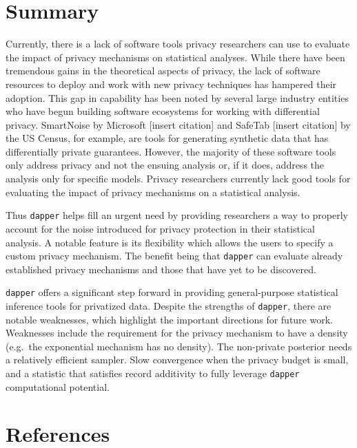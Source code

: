 \hypertarget{summary}{%
\section{Summary}\label{summary}}

Currently, there is a lack of software tools privacy researchers can use
to evaluate the impact of privacy mechanisms on statistical analyses.
While there have been tremendous gains in the theoretical aspects of privacy,
the lack of software resources to deploy and work with new privacy techniques has
hampered their adoption. This gap in capability has been noted by several
large industry entities who have begun building software ecosystems for
working with differential privacy. SmartNoise by Microsoft {[}insert citation{]} and SafeTab {[}insert citation{]} by the US Census, for example,
are tools for generating synthetic data that has differentially private guarantees.
However, the majority of these software tools only address privacy and not the
ensuing analysis or, if it does, address the analysis only for specific models.
Privacy researchers currently lack good tools for evaluating the impact
of privacy mechanisms on a statistical analysis.

Thus \texttt{dapper} helps fill an urgent need by providing researchers a way to properly account
for the noise introduced for privacy protection in their statistical analysis. A notable
feature is its flexibility which allows the users to specify a custom
privacy mechanism. The benefit being that \texttt{dapper} can evaluate already
established privacy mechanisms and those that have yet to be discovered.

\texttt{dapper} offers a significant step forward in providing general-purpose statistical
inference tools for privatized data. Despite the strengths of \texttt{dapper}, there
are notable weaknesses, which highlight the important directions for future work.
Weaknesses include the requirement for the privacy mechanism to have a density
(e.g.~the exponential mechanism has no density). The non-private posterior needs
a relatively efficient sampler. Slow convergence when the privacy budget is small,
and a statistic that satisfies record additivity to fully leverage \texttt{dapper} computational
potential.

\hypertarget{references}{%
\section*{References}\label{references}}


